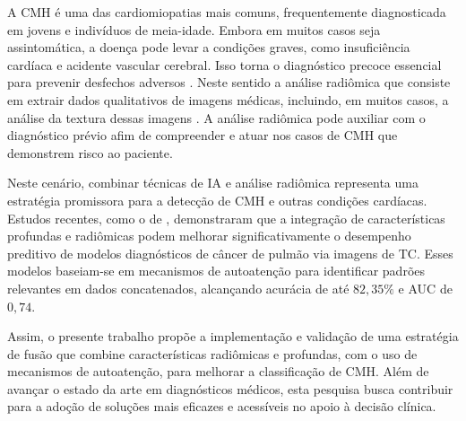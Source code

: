 A \gls{CMH} é uma das cardiomiopatias mais comuns, frequentemente diagnosticada em jovens e indivíduos de meia-idade. Embora em muitos casos seja assintomática, a doença pode levar a condições graves, como insuficiência cardíaca e acidente vascular cerebral. Isso torna o diagnóstico precoce essencial para prevenir desfechos adversos \cite{kwonComparisonMortalityCause2022}. Neste sentido a análise radiômica que consiste em extrair dados qualitativos de imagens médicas, incluindo, em muitos casos, a análise da textura dessas imagens \cite{lambinRadiomicsExtractingMore2012}. A análise radiômica pode auxiliar com o diagnóstico prévio afim de compreender e atuar nos casos de \gls{CMH} que demonstrem risco ao paciente.


Neste cenário, combinar técnicas de \gls{IA} e análise radiômica representa uma estratégia promissora para a detecção de \gls{CMH} e outras condições cardíacas. Estudos recentes, como o de , demonstraram que a integração de características profundas e radiômicas podem melhorar significativamente o desempenho preditivo de modelos diagnósticos de câncer de pulmão via imagens de \gls{TC}. Esses modelos baseiam-se em mecanismos de autoatenção para identificar padrões relevantes em dados concatenados, alcançando acurácia de até $82,35\%$ e \gls{AUC} de $0,74$.



Assim, o presente trabalho propõe a implementação e validação de uma estratégia de fusão que combine características radiômicas e profundas, com o uso de mecanismos de autoatenção, para melhorar a classificação de \gls{CMH}. Além de avançar o estado da arte em diagnósticos médicos, esta pesquisa busca contribuir para a adoção de soluções mais eficazes e acessíveis no apoio à decisão clínica.

